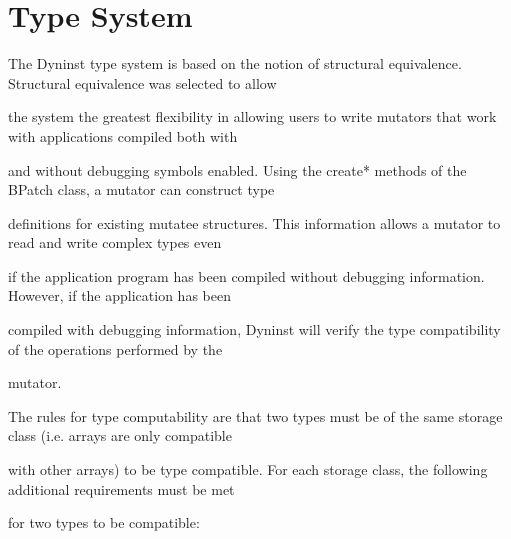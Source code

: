\section{Type System}

The Dyninst type system is based on the notion of structural equivalence. Structural equivalence was selected to allow

the system the greatest flexibility in allowing users to write mutators that work with applications compiled both with

and without debugging symbols enabled. Using the create* methods of the BPatch class, a mutator can construct type

definitions for existing mutatee structures. This information allows a mutator to read and write complex types even

if the application program has been compiled without debugging information. However, if the application has been

compiled with debugging information, Dyninst will verify the type compatibility of the operations performed by the

mutator.



{

The rules for type computability are that two types must be of the same storage class (i.e. arrays are only compatible

with other arrays) to be type compatible. For each storage class, the following additional requirements must be met

for two types to be compatible:}



